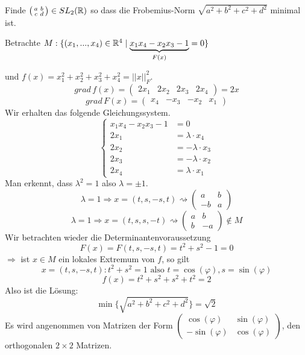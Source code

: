 \documentclass[main.tex]{subfiles}
\begin{document}
\begin{Beispiel}
  Finde $\left(\begin{smallmatrix}
    a & b \\ c & d
  \end{smallmatrix}\right) \in SL_2(\mathbb{R})$ so dass die Frobemius-Norm $\sqrt{a^2 + b^2 + c^2 + d^2}$ minimal ist.

  Betrachte $M: \{(x_1,...,x_4) \in \mathbb{R}^4 \mid \underbrace{x_1x_4 - x_2x_3 - 1}_{F(x)} = 0\}$

  und $f(x) = x_1^2 + x_2^2 + x_3^2 + x_4^2 = ||x||_F^2$.
  $$grad \, f(x) = \begin{pmatrix}
    2x_1 & 2x_2 & 2x_3 & 2x_4
  \end{pmatrix} = 2x$$
  $$grad \, F(x) = \begin{pmatrix}
    x_4 & -x_3 & -x_2 & x_1
  \end{pmatrix}$$
  Wir erhalten das folgende Gleichungssystem.
  $$\left\{\begin{aligned}
    x_1x_4 - x_2x_3 - 1 & = 0 \\
    2x_1 & = \lambda \cdot x_4 \\
    2x_2 & = -\lambda \cdot x_3 \\
    2x_3 & = -\lambda \cdot x_2 \\
    2x_4 & = \lambda \cdot x_1
  \end{aligned}\right.$$
  Man erkennt, dass $\lambda^2 = 1$ also $\lambda = \pm 1$.
  $$\lambda = 1 \Rightarrow x = (t,s,-s,t) \rightsquigarrow \left(\begin{smallmatrix}
    a & b \\ -b & a
  \end{smallmatrix}\right)$$
  $$\lambda = 1 \Rightarrow x = (t,s,s,-t) \rightsquigarrow \left(\begin{smallmatrix}
    a & b \\ b & -a
  \end{smallmatrix}\right) \notin M$$
  Wir betrachten wieder die Determinantenvoraussetzung
  $$F(x) = F(t,s,-s,t) = t^2 +s^2 - 1 = 0$$
  $\Rightarrow$ ist $x \in M$ ein lokales Extremum von $f$, so gilt
  $$x = (t,s,-s,t) : t^2 + s^2 = 1 \text{ also } t = \cos(\varphi), s = \sin(\varphi)$$
  $$f(x) = t^2 + s^2 + s^2 +t^2 = 2$$
  Also ist die Lösung:
  $$\min\{\sqrt{a^2 + b^2 +c^2 +d^2}\} = \sqrt{2}$$
  Es wird angenommen von Matrizen der Form $\left(\begin{smallmatrix}
    \cos(\varphi) & \sin(\varphi) \\
    -\sin(\varphi) & \cos(\varphi)
  \end{smallmatrix}\right)$, den orthogonalen $2 \times 2$ Matrizen.
\end{Beispiel}
\end{document}

